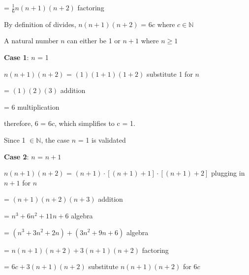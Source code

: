 \documentclass{article} %
\begin{document}
    \tabto*{2.57cm} = $\frac{1}{6}n(n + 1)(n + 2)$ \tabto*{6cm}factoring
    
    \vspace*{0.08cm}

    By definition of divides, $n(n + 1)(n + 2)$ = 6$c$ where $c \in \mathbb{N}$

    A natural number $n$ can either be 1 or $n+1$ where $n \geq 1$

    \vspace*{0.2cm}

    \textbf{Case 1}: $n$ = 1

    $n(n + 1)(n + 2)$ = $(1)(1 + 1)(1 + 2)$ \tabto*{6.3cm}substitute 1 for $n$

    \vspace*{0.08cm}

    \tabto*{3.06cm} = $(1)(2)(3)$ \tabto*{6.3cm}addition
    
    \vspace*{0.08cm}

    \tabto*{3.06cm} = $6$ \tabto*{6.3cm}multiplication
    
    \vspace*{0.08cm}

    therefore, 6 = 6$c$, which simplifies to c = 1.

    Since 1 $\in \mathbb{N}$, the case $n$ = 1 is validated

    \vspace*{0.2cm}
    
    \textbf{Case 2}: $n$ = $n + 1$
    \vspace*{0.08cm}

    $n(n + 1)(n + 2)$ = $(n + 1)\cdot [(n + 1) + 1]\cdot [(n + 1) + 2]$ \tabto*{9.3cm}plugging in $n+1$ for $n$
    \vspace*{0.08cm}

    \tabto*{3.06cm} = $(n + 1)(n + 2)(n + 3)$ \tabto*{9.3cm}addition
    \vspace*{0.08cm}

    \tabto*{3.06cm} = $n^3 + 6n^2 + 11n + 6$ \tabto*{9.3cm}algebra
    \vspace*{0.08cm}

    \tabto*{3.06cm} = $(n^3 +3n^2 + 2n) + (3n^2 + 9n + 6)$ \tabto*{9.3cm}algebra
    \vspace*{0.08cm}

    \tabto*{3.06cm} = $n(n+1)(n+2) + 3(n+1)(n+2)$ \tabto*{9.3cm}factoring
    \vspace*{0.08cm}

    \tabto*{3.06cm} = $6c + 3(n+1)(n+2)$ \tabto*{9.3cm}substitute $n(n+1)(n+2)$ for $6c$
    \vspace*{0.08cm}
\end{document}
